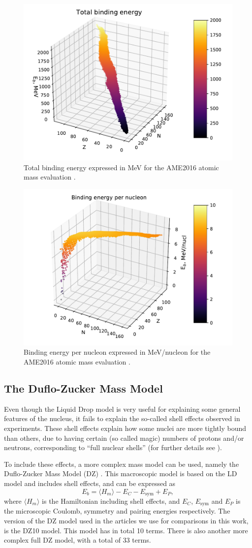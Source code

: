\documentclass[numberedappendix, twocolappendix]{emulateapj}
\begin{document}
\begin{figure}[!htb]
    \centering
    \includegraphics[width=.49\textwidth]{Figures/Total_binding_eng.pdf}
    \caption{Total binding energy expressed in MeV for the AME2016 atomic mass evaluation \cite{ame16}.}
    \label{fig: total binding energy}
\end{figure}

\begin{figure}[!htb]
    \centering
    \includegraphics[width=.49\textwidth]{Figures/Binding_eng.pdf}
    \caption{Binding energy per nucleon expressed in MeV/nucleon for the AME2016 atomic mass evaluation \cite{ame16}.}
    \label{fig: binding energy}
\end{figure}

\subsection{The Duflo-Zucker Mass Model}
\label{sec: DZ}
Even though the Liquid Drop model is very useful for explaining some general features of the nucleus, it fails to explain the so-called shell effects observed in experiments. These shell effects explain how some nuclei are more tightly bound than others, due to having certain (so called magic) numbers of protons and/or neutrons, corresponding to ``full nuclear shells'' (for further details see \cite{krane}).

To include these effects, a more complex mass model can be used, namely the Duflo-Zucker Mass Model (DZ) \cite{dz}. This macroscopic model is based on the LD model and includes shell effects, and can be expressed as
\begin{equation}
E_b = \langle H_{m}\rangle - E_C - E_{\mathrm{sym}} + E_P , 
\end{equation}
where $\langle H_{m}\rangle$ is the Hamiltonian including shell effects, and $E_C$, $E_{\mathrm{sym}}$ and $E_P$ is the microscopic Coulomb, symmetry and pairing energies respectively. The version of the DZ model used in the articles we use for comparisons in this work, is the DZ10 model. This model has in total 10 terms. There is also another more complex full DZ model, with a total of 33 terms.
\end{document}
